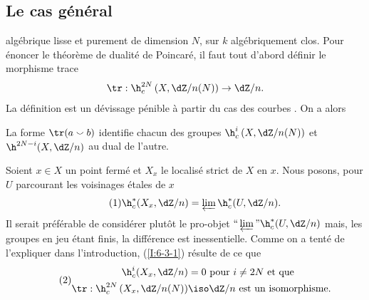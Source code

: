 









\subsection{Le cas général}\label{I:6-3}

 algébrique lisse et purement de dimension $N$, sur 
$k$ algébriquement clos. Pour énoncer le théorème de dualité de 
Poincaré, il faut tout d'abord définir le morphisme trace 
\[
  \tr : \h_c^{2N}\left(X,\dZ/n(N)\right) \to \dZ/n\text{.}
\]
La définition est un dévissage pénible à partir du cas des courbes 
. On a alors 





\begin{theorem}\label{I:6-3-1}
La forme $\tr(a\smallsmile b)$ identifie chacun des groupes 
$\h_c^i\left(X,\dZ/n(N)\right)$ et $\h^{2 N-i}(X,\dZ/n)$ au dual de l'autre.
\end{theorem}

Soient $x\in X$ un point fermé et $X_x$ le localisé strict de $X$ en $x$. 
Nous posons, pour $U$ parcourant les voisinages étales de $x$ 
\begin{equation*}\tag{1}\label{I:eq:6-3-1-1}
  \h_c^*(X_x,\dZ/n) = \varprojlim \h_c^*(U,\dZ/n) \text{.}
\end{equation*}
Il serait préférable de considérer plutôt le pro-objet 
$\text{``}\varprojlim\text{''} \h_c^*(U,\dZ/n)$ mais, les groupes en jeu 
étant finis, la différence est inessentielle. Comme on a tenté de 
l'expliquer dans l'introduction, (\ref{I:6-3-1}) résulte de ce que 
\begin{equation*}\tag{2}\label{I:eq:6-3-1-2}
\begin{aligned}
  \h_c^i(X_x,\dZ/n) &= 0 \text{ pour $i\ne 2N$ et que } \\
  \tr : \h_c^{2 N}\left(X_x,  \dZ/n(N)\right) &\iso \dZ/n \text{ est un isomorphisme.} 
\end{aligned}
\end{equation*}

